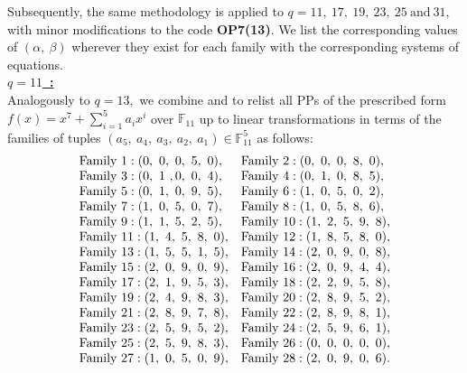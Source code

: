 \documentclass[12pt,a4wide, reqno]{amsart}
\theoremstyle{definition}
\theoremstyle{remark}
\numberwithin{equation}{section}
\begin{document}
Subsequently, the same methodology is applied to $q=11,~17,~19,~23,~25~\text{and}~31,$ with minor modifications to the code \textbf{OP7(13)}. We list the corresponding values of $(\alpha,~\beta)$ wherever they exist for each family with the corresponding systems of equations.
\vspace{0.5 cm}
\\
\underline{\Large \textbf{$q=11$~:}}
\vspace{0.2cm}
\\
Analogously to $q=13,$ we combine  and  to relist all PPs of the prescribed form $f(x)=x^7+\sum_{i=1}^{5}a_ix^i$ over $\mathbb{F}_{11}$ up to linear transformations in terms of the families of tuples $(a_5,~a_4,~a_3,~a_2,~a_1)\in\mathbb{F}_{11}^5$ as follows:
\begin{equation*}
\begin{matrix*}[l]
    \textup{Family 1}:(0,~0,~0,~5,~0), & \textup{Family 2}:(0,~0,~0,~8,~0),\\
    \textup{Family 3}: (0,~1~,0,~0,~4), &\textup{Family 4}:(0,~1,~0,~8,~5), \\
     \textup{Family 5}:(0,~1,~0,~9,~5),& \textup{Family 6}: (1,~0,~5,~0,~2),\\
    \textup{Family 7}:(1,~0,~5,~0,~7),& \textup{Family 8}:(1,~0,~5,~8,~6),\\
 \textup{Family 9}:(1,~1,~5,~2,~5),& \textup{Family 10}:(1,~2,~5,~9,~8),\\
 \textup{Family 11}:(1,~4,~5,~8,~0), & \textup{Family 12}:(1,~8,~5,~8,~0),\\
 \textup{Family 13}:(1,~5,~5,~1,~5),& \textup{Family 14}:(2,~0,~9,~0,~8), \\
 \textup{Family 15}:(2,~0,~9,~0,~9), & \textup{Family 16}:(2,~0,~9,~4,~4),\\
 \textup{Family 17}:(2,~1,~9,~5,~3), & \textup{Family 18}:(2,~2,~9,~5,~8),\\
 \textup{Family 19}:(2,~4,~9,~8,~3), & \textup{Family 20}:(2,~8,~9,~5,~2),\\
 \textup{Family 21}:(2,~8,~9,~7,~8), & \textup{Family 22}:(2,~8,~9,~8,~1),\\
 \textup{Family 23}:(2,~5,~9,~5,~2), & \textup{Family 24}:(2,~5,~9,~6,~1),\\
 \textup{Family 25}:(2,~5,~9,~8,~3), & \textup{Family 26}:(0,~0,~0,~0,~0),\\
 \textup{Family 27}:(1,~0,~5,~0,~9), & \textup{Family 28}:(2,~0,~9,~0,~6).\\
\end{matrix*}
\end{equation*}
\end{document}
